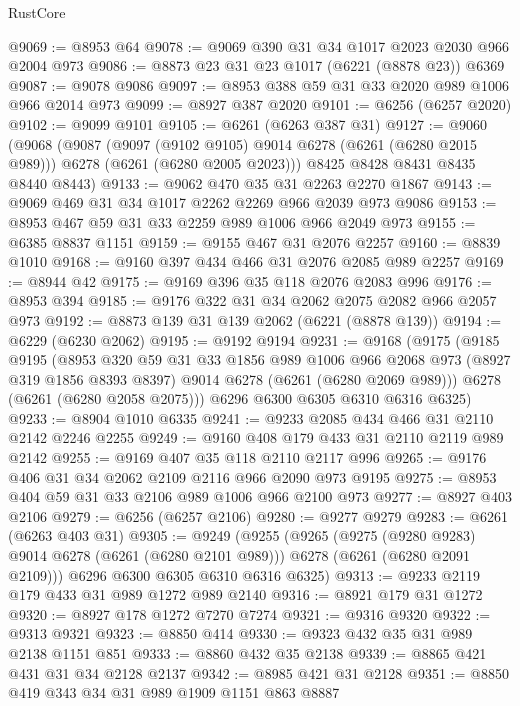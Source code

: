 \begin{lexlean}{RustCore}
\begin{coremodule}
@9069 := @8953 @64
@9078 := @9069 @390 @31 @34 @1017 @2023 @2030 @966 @2004 @973
@9086 := @8873 @23 @31 @23 @1017 (@6221 (@8878 @23)) @6369
@9087 := @9078 @9086
@9097 := @8953 @388 @59 @31 @33 @2020 @989 @1006 @966 @2014 @973
@9099 := @8927 @387 @2020
@9101 := @6256 (@6257 @2020)
@9102 := @9099 @9101
@9105 := @6261 (@6263 @387 @31)
@9127 := @9060
    (@9068
      (@9087
        (@9097 (@9102 @9105) @9014 @6278 (@6261 (@6280 @2015 @989)))
        @6278
        (@6261 (@6280 @2005 @2023)))
      @8425
      @8428
      @8431
      @8435
      @8440
      @8443)
@9133 := @9062 @470 @35 @31 @2263 @2270 @1867
@9143 := @9069 @469 @31 @34 @1017 @2262 @2269 @966 @2039 @973 @9086
@9153 := @8953 @467 @59 @31 @33 @2259 @989 @1006 @966 @2049 @973
@9155 := @6385 @8837 @1151
@9159 := @9155 @467 @31 @2076 @2257
@9160 := @8839 @1010
@9168 := @9160 @397 @434 @466 @31 @2076 @2085 @989 @2257
@9169 := @8944 @42
@9175 := @9169 @396 @35 @118 @2076 @2083 @996
@9176 := @8953 @394
@9185 := @9176 @322 @31 @34 @2062 @2075 @2082 @966 @2057 @973
@9192 := @8873 @139 @31 @139 @2062 (@6221 (@8878 @139))
@9194 := @6229 (@6230 @2062)
@9195 := @9192 @9194
@9231 := @9168
    (@9175
      (@9185
        @9195
        (@8953
          @320
          @59
          @31
          @33
          @1856
          @989
          @1006
          @966
          @2068
          @973
          (@8927 @319 @1856 @8393 @8397)
          @9014
          @6278
          (@6261 (@6280 @2069 @989)))
        @6278
        (@6261 (@6280 @2058 @2075)))
      @6296
      @6300
      @6305
      @6310
      @6316
      @6325)
@9233 := @8904 @1010 @6335
@9241 := @9233 @2085 @434 @466 @31 @2110 @2142 @2246 @2255
@9249 := @9160 @408 @179 @433 @31 @2110 @2119 @989 @2142
@9255 := @9169 @407 @35 @118 @2110 @2117 @996
@9265 := @9176 @406 @31 @34 @2062 @2109 @2116 @966 @2090 @973 @9195
@9275 := @8953 @404 @59 @31 @33 @2106 @989 @1006 @966 @2100 @973
@9277 := @8927 @403 @2106
@9279 := @6256 (@6257 @2106)
@9280 := @9277 @9279
@9283 := @6261 (@6263 @403 @31)
@9305 := @9249
    (@9255
      (@9265
        (@9275 (@9280 @9283) @9014 @6278 (@6261 (@6280 @2101 @989)))
        @6278
        (@6261 (@6280 @2091 @2109)))
      @6296
      @6300
      @6305
      @6310
      @6316
      @6325)
@9313 := @9233 @2119 @179 @433 @31 @989 @1272 @989 @2140
@9316 := @8921 @179 @31 @1272
@9320 := @8927 @178 @1272 @7270 @7274
@9321 := @9316 @9320
@9322 := @9313 @9321
@9323 := @8850 @414
@9330 := @9323 @432 @35 @31 @989 @2138 @1151 @851
@9333 := @8860 @432 @35 @2138
@9339 := @8865 @421 @431 @31 @34 @2128 @2137
@9342 := @8985 @421 @31 @2128
@9351 := @8850 @419 @343 @34 @31 @989 @1909 @1151 @863 @8887

\end{coremodule}
\end{lexlean}
